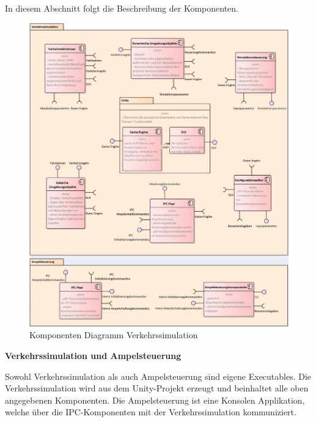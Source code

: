In diesem Abschnitt folgt die Beschreibung der Komponenten.

\begin{figure}[H]
\begin{center}
	\includegraphics[scale=0.673]{BilderAllgemein/Komponentdiagram.JPG}
\end{center}
	\caption{Komponenten Diagramm Verkehrssimulation}
\end{figure}

\begin{flushleft}
\textbf{Verkehrssimulation und Ampelsteuerung}
\end{flushleft}
\vspace{-0.3 cm}

Sowohl Verkehrssimulation als auch Ampelsteuerung sind eigene Executables. Die Verkehrssimulation wird aus dem Unity-Projekt erzeugt und beinhaltet alle oben angegebenen Komponenten. Die Ampelsteuerung ist eine Konsolen Applikation, welche über die IPC-Komponenten mit der Verkehrssimulation kommuniziert.

